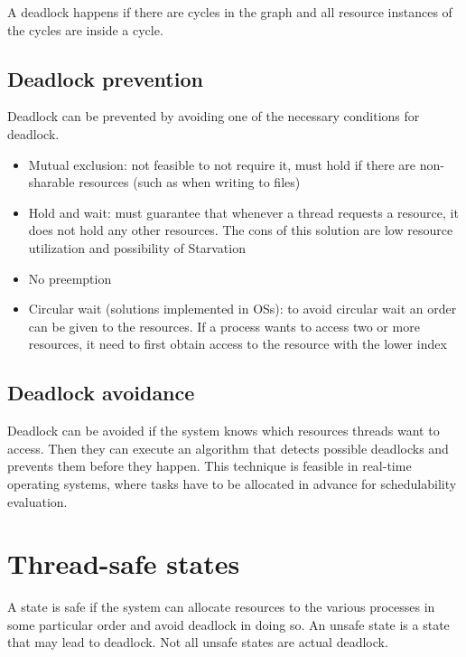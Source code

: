 A deadlock happens if there are cycles in the graph and all resource instances of the cycles are inside a cycle.


\subsection{Deadlock prevention}
Deadlock can be prevented by avoiding one of the necessary conditions for deadlock.
\begin{itemize}
    \item Mutual exclusion: not feasible to not require it, must hold if there are non-sharable resources (such as when writing to files)
    \item Hold and wait: must guarantee that whenever a thread requests a resource, it does not hold any other resources. The cons of this solution are low resource utilization and possibility of Starvation
    \item No preemption
    \item Circular wait (solutions implemented in OSs): to avoid circular wait an order can be given to the resources. If a process wants to access two or more resources, it need to first obtain access to the resource with the lower index
\end{itemize}

\subsection{Deadlock avoidance}
Deadlock can be avoided if the system knows which resources threads want to access. Then they can execute an algorithm that detects possible deadlocks and prevents them before they happen. This technique is feasible in real-time operating systems, where tasks have to be allocated in advance for schedulability evaluation.

\section{Thread-safe states}
A state is safe if the system can allocate resources to the various processes in some particular order and avoid deadlock in doing so. An unsafe state is a state that may lead to deadlock. Not all unsafe states are actual deadlock.